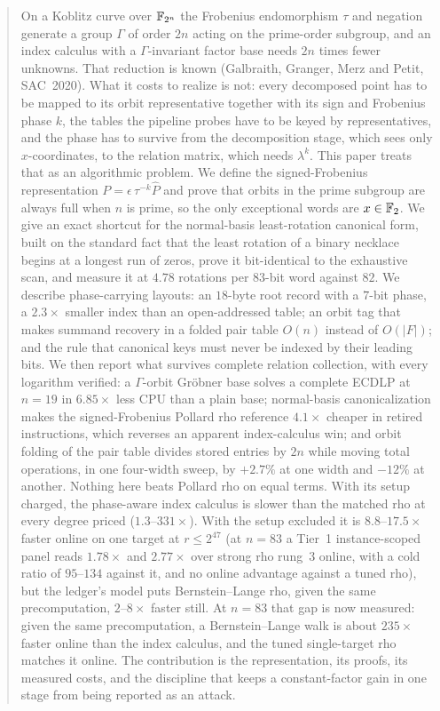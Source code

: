 \begin{abstract}
On a Koblitz curve over $\FF_{2^n}$ the Frobenius endomorphism $\tau$
and negation generate a group $\Gamma$ of order $2n$ acting on the
prime-order subgroup, and an index calculus with a $\Gamma$-invariant
factor base needs $2n$ times fewer unknowns. That reduction is known
(Galbraith, Granger, Merz and Petit, SAC~2020). What it costs to
realize is not: every decomposed point has to be mapped to its orbit
representative together with its sign and Frobenius phase
$k$, the tables the pipeline probes have to be keyed by
representatives, and the phase has to survive from the decomposition
stage, which sees only $x$-coordinates, to the relation matrix, which
needs $\lambda^k$. This paper treats that as an algorithmic problem.
We define the signed-Frobenius representation $P=\epsilon\,\tau^{-k}\hat P$
and prove that orbits in the prime subgroup are always full when $n$
is prime, so the only exceptional words are $x\in\FF_2$. We give an
exact shortcut for the normal-basis least-rotation canonical form,
built on the standard fact that the least rotation of a binary necklace
begins at a longest run of zeros, prove it bit-identical to the exhaustive
scan, and measure it at $4.78$ rotations per $83$-bit word against
$82$. We describe phase-carrying layouts: an $18$-byte root record
with a $7$-bit phase, a $2.3\times$ smaller index than an open-addressed
table; an orbit tag that makes summand recovery in a folded pair table
$O(n)$ instead of $O(|F|)$; and the rule that canonical keys must never
be indexed by their leading bits. We then report what survives complete
relation collection, with every logarithm verified: a $\Gamma$-orbit
Gr\"obner base solves a complete ECDLP at $n=19$ in $6.85\times$ less
CPU than a plain base; normal-basis canonicalization makes the
signed-Frobenius Pollard rho reference $4.1\times$ cheaper in retired
instructions, which reverses an apparent index-calculus win; and
orbit folding of the pair table divides stored entries by $2n$ while
moving total operations, in one four-width sweep, by $+2.7\%$ at one
width and $-12\%$ at another. Nothing here beats Pollard rho on equal terms. With its setup
charged, the phase-aware index calculus is slower than the matched rho
at every degree priced ($1.3$--$331\times$). With the setup excluded
it is $8.8$--$17.5\times$ faster online on one target at $r\le2^{47}$ (at $n=83$ a Tier~1 instance-scoped panel reads $1.78\times$ and $2.77\times$ over strong rho rung~3 online, with a cold ratio of $95$--$134$ against it, and no online advantage against a tuned rho),
but the ledger's model puts Bernstein--Lange rho, given the same
precomputation, $2$--$8\times$ faster still. At $n=83$ that gap is now measured: given the same precomputation, a Bernstein--Lange walk is about $235\times$ faster online than the index calculus, and the tuned single-target rho matches it online. The contribution is the representation, its proofs,
its measured costs, and the discipline that keeps a constant-factor
gain in one stage from being reported as an attack.
\end{abstract}
